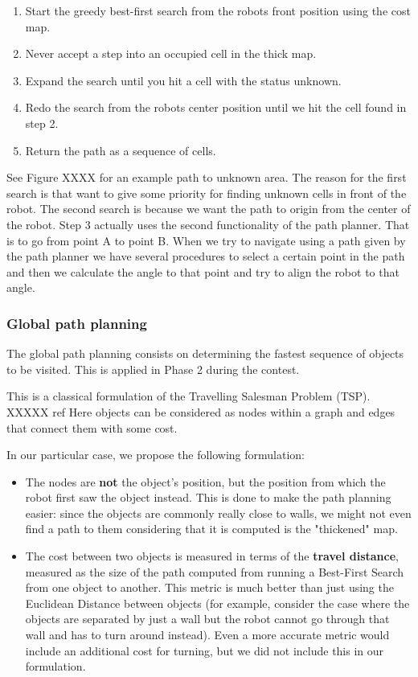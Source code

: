 \begin{enumerate}
\item Start the greedy best-first search from the robots front position using the cost map.
\item Never accept a step into an occupied cell in the thick map.
\item Expand the search until you hit a cell with the status unknown.
\item Redo the search from the robots center position until we hit the cell found in step 2.
\item Return the path as a sequence of cells.
\end{enumerate}

See Figure XXXX for an example path to unknown area. The reason for the first search is that want to give some priority for finding unknown cells in front of the robot. The second search is because we want the path to origin from the center of the robot. Step 3 actually uses the second functionality of the path planner. That is to go from point A to point B. When we try to navigate using a path given by the path planner we have several procedures to select a certain point in the path and then we calculate the angle to that point and try to align the robot to that angle.

\subsubsection{Global path planning}
The global path planning consists on determining the fastest sequence of objects to be visited. This is applied in Phase 2 during the contest. 

This is a classical formulation of the Travelling Salesman Problem (TSP). XXXXX ref Here objects can be considered as nodes within a graph and edges that connect them with some cost.

In our particular case, we propose the following formulation:
\begin{itemize}
\item The nodes are \textbf{not} the object's position, but the position from which the robot first saw the object instead. This is done to make the path planning easier: since the objects are commonly really close to walls, we might not even find a path to them considering that it is computed is the "thickened" map. 
\item The cost between two objects is measured in terms of the \textbf{travel distance}, measured as the size of the path computed from running a Best-First Search from one object to another. This metric is much better than just using the Euclidean Distance between objects (for example, consider the case where the objects are separated by just a wall but the robot cannot go through that wall and has to turn around instead). Even a more accurate metric would include an additional cost for turning, but we did not include this in our formulation.
\end{itemize}

